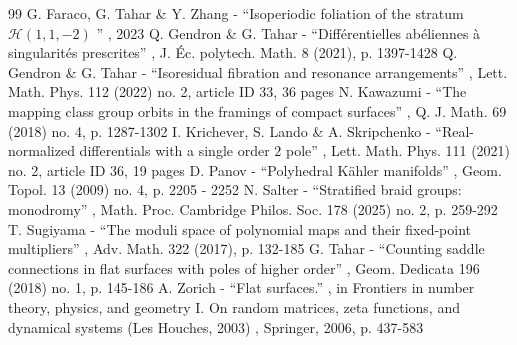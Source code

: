 \documentclass[11pt]{article}
\theoremstyle{definition}
\begin{document}
\begin{thebibliography}{99}
 G. Faraco, G. Tahar \& Y. Zhang - “Isoperiodic foliation of the stratum $\mathcal{H}(1,1,-2)$ ” , 2023
 Q. Gendron \& G. Tahar - “Différentielles abéliennes à singularités prescrites” , J. Éc. polytech. Math. 8 (2021), p. 1397-1428
 Q. Gendron \& G. Tahar - “Isoresidual fibration and resonance arrangements” , Lett. Math. Phys. 112 (2022) no. 2, article ID 33, 36 pages
 N. Kawazumi - “The mapping class group orbits in the framings of compact surfaces” , Q. J. Math. 69 (2018) no. 4, p. 1287-1302
 I. Krichever, S. Lando \& A. Skripchenko - “Real-normalized differentials with a single order $2$ pole” , Lett. Math. Phys. 111 (2021) no. 2, article ID 36, 19 pages
 D. Panov - “Polyhedral Kähler manifolds” , Geom. Topol. 13 (2009) no. 4, p. 2205 - 2252
 N. Salter - “Stratified braid groups: monodromy” , Math. Proc. Cambridge Philos. Soc. 178 (2025) no. 2, p. 259-292
 T. Sugiyama - “The moduli space of polynomial maps and their fixed-point multipliers” , Adv. Math. 322 (2017), p. 132-185
 G. Tahar - “Counting saddle connections in flat surfaces with poles of higher order” , Geom. Dedicata 196 (2018) no. 1, p. 145-186
 A. Zorich - “Flat surfaces.” , in Frontiers in number theory, physics, and geometry I. On random matrices, zeta functions, and dynamical systems (Les Houches, 2003) , Springer, 2006, p. 437-583
\end{thebibliography}
\end{document}
